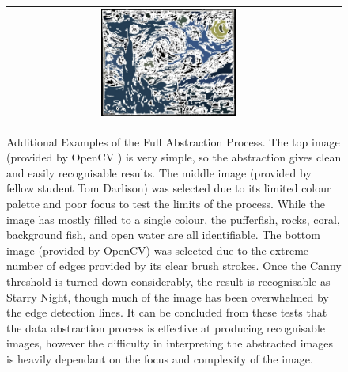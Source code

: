 \begin{figure}[ht]
\begin{center}
\begin{tabular}{ c c }
        \includegraphics[width=0.43\textwidth]{Figures/starry_nightDA.jpg} 
    \end{tabular}
    \caption[Additional Examples of the Full Abstraction Process]{Additional Examples of the Full Abstraction Process. The top image (provided by OpenCV \cite{OpenCV}) is very simple, so the abstraction gives clean and easily recognisable results. The middle image (provided by fellow student Tom Darlison) was selected due to its limited colour palette and poor focus to test the limits of the process. While the image has mostly filled to a single colour, the pufferfish, rocks, coral, background fish, and open water are all identifiable. The bottom image (provided by OpenCV) was selected due to the extreme number of edges provided by its clear brush strokes. Once the Canny threshold is turned down considerably, the result is recognisable as Starry Night, though much of the image has been overwhelmed by the edge detection lines. It can be concluded from these tests that the data abstraction process is effective at producing recognisable images, however the difficulty in interpreting the abstracted images is heavily dependant on the focus and complexity of the image.}
    \label{fig:FinalExtras}
    \end{center}
\end{figure}